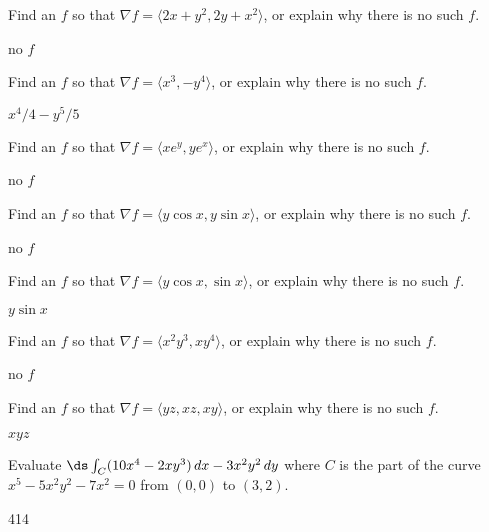 \begin{enumialphparenastyle}


\begin{ex}
Find an $f$ so that $\nabla f=\langle 2x+y^2,2y+x^2\rangle$, or
explain why there is no such $f$.
\begin{sol}
	no $f$
\end{sol}
\end{ex}

\begin{ex}
Find an $f$ so that $\nabla f=\langle x^3,-y^4\rangle$, 
or explain why there is no such $f$.
\begin{sol}
	$x^4/4-y^5/5$
\end{sol}
\end{ex}

\begin{ex}
Find an $f$ so that $\nabla f=\langle xe^y,ye^x \rangle$, 
or explain why there is no such $f$.
\begin{sol}
	no $f$
\end{sol}
\end{ex}

\begin{ex}
Find an $f$ so that $\nabla f=\langle y\cos x,y\sin x \rangle$, 
or explain why there is no such $f$.
\begin{sol}
	no $f$
\end{sol}
\end{ex}

\begin{ex}
Find an $f$ so that $\nabla f=\langle y\cos x,\sin x\rangle$, 
or explain why there is no such $f$.
\begin{sol}
	$y\sin x$
\end{sol}
\end{ex}

\begin{ex}
Find an $f$ so that $\nabla f=\langle x^2y^3,xy^4\rangle$, 
or explain why there is no such $f$.
\begin{sol}
	no $f$
\end{sol}
\end{ex}

\begin{ex}
Find an $f$ so that $\nabla f=\langle yz,xz,xy\rangle$, 
or explain why there is no such $f$.
\begin{sol}
	$xyz$
\end{sol}
\end{ex}

\begin{ex}
Evaluate $\ds\int_C (10x^4 - 2xy^3)\,dx - 3x^2y^2\,dy$ where $C$ is
the part of the curve $x^5-5x^2y^2-7x^2=0$ from $(0,0)$ to
$(3,2)$.
\begin{sol}
	414
\end{sol}
\end{ex}


\end{enumialphparenastyle}
